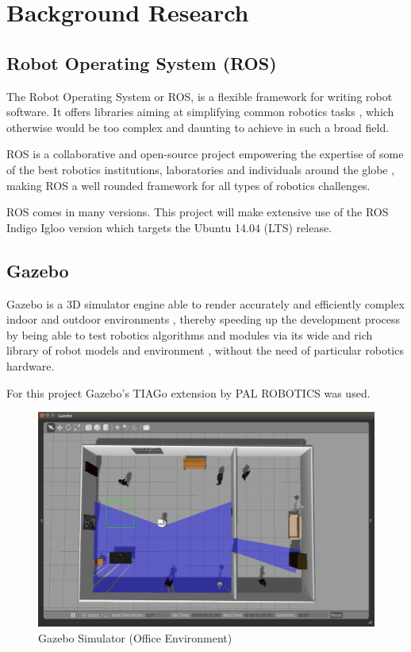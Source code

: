 \chapter{Background Research}
\label{chapter2}

\section{Robot Operating System (ROS)}

The Robot Operating System or ROS, is a flexible framework for writing robot software. It offers libraries aiming at simplifying common robotics tasks \cite{website:aboutROS}, which otherwise would be too complex and daunting to achieve in such a broad field.

ROS is a collaborative and open-source project empowering the expertise of some of the best robotics institutions, laboratories and individuals around the globe \cite{website:aboutROS}, making ROS a well rounded framework for all types of robotics challenges. 

ROS comes in many versions. This project will make extensive use of the ROS Indigo Igloo version which targets the Ubuntu 14.04 (LTS) release.

\section{Gazebo}

Gazebo is a 3D simulator engine able to render accurately and efficiently complex indoor and outdoor environments \cite{website:Gazebo}, thereby speeding up the development process by being able to test robotics algorithms and modules via its wide and rich library of robot models and environment \cite{website:Gazebo}, without the need of particular robotics hardware.

For this project Gazebo's TIAGo extension by PAL ROBOTICS was used.

\begin{figure}[!htbp]
\begin{center}
\includegraphics[width=\linewidth]{images/gazebo_screenshot1.png}
\end{center}
\caption{Gazebo Simulator (Office Environment)}
\label{fig:gazebo_screenshot1}
\end{figure}

